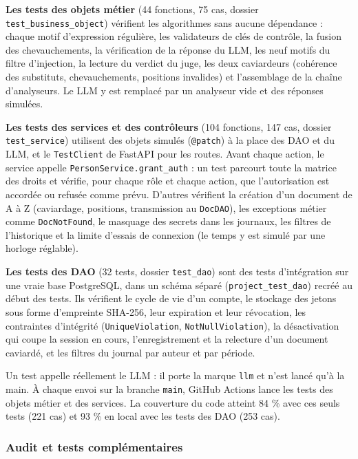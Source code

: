 \documentclass[12pt,a4paper]{article}
\begin{document}
\textbf{Les tests des objets métier} (44 fonctions, 75 cas, dossier \texttt{test\_business\_object}) vérifient les algorithmes sans aucune dépendance : chaque motif d'expression régulière, les validateurs de clés de contrôle, la fusion des chevauchements, la vérification de la réponse du LLM, les neuf motifs du filtre d'injection, la lecture du verdict du juge, les deux caviardeurs (cohérence des substituts, chevauchements, positions invalides) et l'assemblage de la chaîne d'analyseurs. Le LLM y est remplacé par un analyseur vide et des réponses simulées.

\textbf{Les tests des services et des contrôleurs} (104 fonctions, 147 cas, dossier \texttt{test\_service}) utilisent des objets simulés (\texttt{@patch}) à la place des DAO et du LLM, et le \texttt{TestClient} de FastAPI pour les routes. Avant chaque action, le service appelle \texttt{PersonService.grant\_auth} : un test parcourt toute la matrice des droits et vérifie, pour chaque rôle et chaque action, que l'autorisation est accordée ou refusée comme prévu. D'autres vérifient la création d'un document de A à Z (caviardage, positions, transmission au \texttt{DocDAO}), les exceptions métier comme \texttt{DocNotFound}, le masquage des secrets dans les journaux, les filtres de l'historique et la limite d'essais de connexion (le temps y est simulé par une horloge réglable).

\textbf{Les tests des DAO} (32 tests, dossier \texttt{test\_dao}) sont des tests d'intégration sur une vraie base PostgreSQL, dans un schéma séparé (\texttt{project\_test\_dao}) recréé au début des tests. Ils vérifient le cycle de vie d'un compte, le stockage des jetons sous forme d'empreinte SHA-256, leur expiration et leur révocation, les contraintes d'intégrité (\texttt{UniqueViolation}, \texttt{NotNullViolation}), la désactivation qui coupe la session en cours, l'enregistrement et la relecture d'un document caviardé, et les filtres du journal par auteur et par période.

Un test appelle réellement le LLM : il porte la marque \texttt{llm} et n'est lancé qu'à la main. À chaque envoi sur la branche \texttt{main}, GitHub Actions lance les tests des objets métier et des services. La couverture du code atteint 84 \% avec ces seuls tests (221 cas) et 93 \% en local avec les tests des DAO (253 cas).

\subsubsection{Audit et tests complémentaires}
\end{document}
